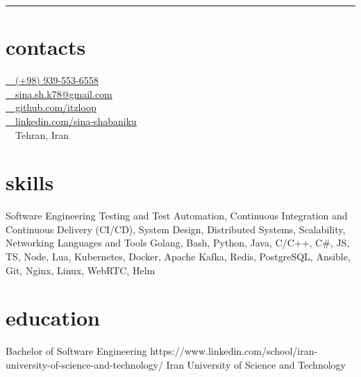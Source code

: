 \documentclass[a4paper]{article}
\begin{document}
\begin{center}
\end{center}
\vspace*{1pt}
\begin{center}
\end{center}
\rule{\textwidth}{1pt}
\vspace{40pt}
\begin{minipage}[t]{0.3\textwidth}
  \preparetopsec
  \section{contacts}
  {
    \href{tel:+989395536558}{ \small~~(+98) 939-553-6558} \\ \vspace{6pt}  
    \href{mailto:sina.sh.k78@gmail.com}{ \small~~sina.sh.k78@gmail.com} \\ \vspace{6pt} 
    \href{https://github.com/itzloop}{ \small~~github.com/itzloop}\\ \vspace{6pt} 
    \href{https://linkedin.com/in/sina-shabaniku}{ \small~~linkedin.com/sina-shabaniku} \\ \vspace{6pt} 
     \small~~Tehran, Iran
    \vspace*{14pt}
  }

  \preparenormalsec
  \section{skills}
  {
    \skill
      {Software Engineering}
      {Testing and Test Automation, Continuous Integration and Continuous Delivery (CI/CD), System Design, Distributed Systems, Scalability, Networking}
    \vspace*{6pt}
    \skill
      {Languages and Tools}
      {Golang, Bash, Python, Java, C/C++, C\#, JS, TS, Node, Lua, Kubernetes, Docker, Apache Kafka, Redis, PostgreSQL, Ansible, Git, Nginx, Linux, WebRTC, Helm}
  }
  \preparenormalsec
  \section{education}
  {
    \edu
      {Bachelor of Software Engineering}
      {https://www.linkedin.com/school/iran-university-of-science-and-technology/}
      {Iran University of Science and Technology}
      {}
  }
  \preparenormalsec

\end{minipage}
\end{document}
